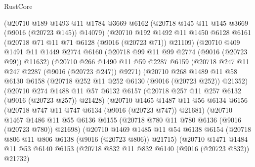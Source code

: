 \begin{lexlean}{RustCore}
\begin{coremodule}
          (@20710
            @189
            @1493
            @11
            @1784
            @3669
            @6162
            (@20718 @145 @11 @145 @3669 (@9016 (@20723 @145)) @14079)
            (@20710
              @192
              @1492
              @11
              @1450
              @6128
              @6161
              (@20718 @71 @11 @71 @6128 (@9016 (@20723 @71)) @21109)
              (@20710
                @409
                @1491
                @11
                @1449
                @2774
                @6160
                (@20718 @99 @11 @99 @2774 (@9016 (@20723 @99)) @11632)
                (@20710
                  @266
                  @1490
                  @11
                  @59
                  @2287
                  @6159
                  (@20718 @247 @11 @247 @2287 (@9016 (@20723 @247)) @9271)
                  (@20710
                    @268
                    @1489
                    @11
                    @58
                    @6130
                    @6158
                    (@20718 @252 @11 @252 @6130 (@9016 (@20723 @252)) @21352)
                    (@20710
                      @274
                      @1488
                      @11
                      @57
                      @6132
                      @6157
                      (@20718 @257 @11 @257 @6132 (@9016 (@20723 @257)) @21428)
                      (@20710
                        @1465
                        @1487
                        @11
                        @56
                        @6134
                        @6156
                        (@20718 @747 @11 @747 @6134 (@9016 (@20723 @747)) @21681)
                        (@20710
                          @1467
                          @1486
                          @11
                          @55
                          @6136
                          @6155
                          (@20718 @780 @11 @780 @6136 (@9016 (@20723 @780)) @21698)
                          (@20710
                            @1469
                            @1485
                            @11
                            @54
                            @6138
                            @6154
                            (@20718 @806 @11 @806 @6138 (@9016 (@20723 @806)) @21715)
                            (@20710
                              @1471
                              @1484
                              @11
                              @53
                              @6140
                              @6153
                              (@20718 @832 @11 @832 @6140 (@9016 (@20723 @832)) @21732)

\end{coremodule}
\end{lexlean}
